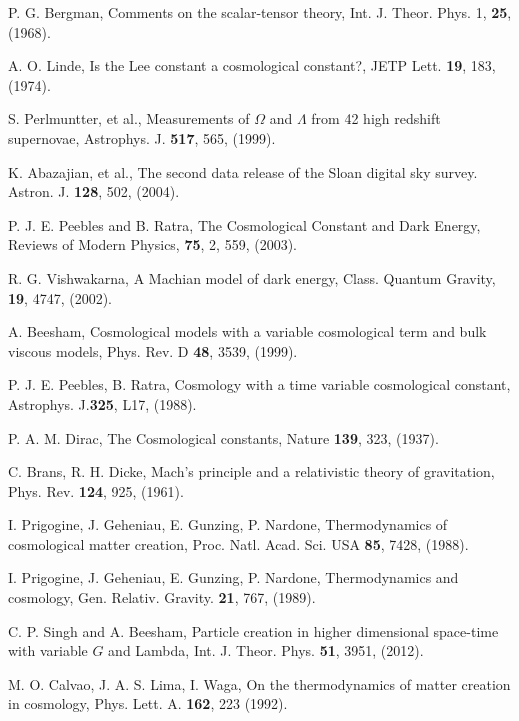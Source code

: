 \documentclass[superscriptaddress,showpacs,pre,twocolumn]{revtex4-1}
\begin{document}
\begin{thebibliography}{99}
	

 P. G. Bergman, Comments on the scalar-tensor theory, Int. J. Theor. Phys. 1, \textbf{25}, (1968).

 A. O. Linde, Is the Lee constant a cosmological constant?, JETP Lett. \textbf{19}, 183, (1974).

 S. Perlmuntter, et al., Measurements of $\Omega$ and $\Lambda$ from 42 high redshift supernovae, Astrophys. J. \textbf{517}, 565, (1999).

 K. Abazajian, et al., The second data release of the Sloan digital sky survey. Astron. J. \textbf{128}, 502, (2004).

 P. J. E. Peebles and B. Ratra, The Cosmological Constant and Dark Energy, Reviews of Modern Physics, \textbf{75}, 2, 559, (2003).


 R. G. Vishwakarna, A Machian model of dark energy, Class. Quantum Gravity, \textbf{19}, 4747, (2002).

 A. Beesham, Cosmological models with a variable cosmological term and bulk viscous models, Phys. Rev. D \textbf{48}, 3539, (1999).

 P. J. E. Peebles, B. Ratra, Cosmology with a time variable cosmological constant, Astrophys. J.\textbf{325}, L17, (1988).

 P. A. M. Dirac, The Cosmological constants, Nature \textbf{139}, 323, (1937).

 C. Brans, R. H. Dicke, Mach's principle and a relativistic theory of gravitation, Phys. Rev. \textbf{124}, 925, (1961).

 I. Prigogine, J. Geheniau, E. Gunzing, P. Nardone, Thermodynamics of cosmological matter creation, Proc. Natl. Acad. Sci. USA \textbf{85}, 7428, (1988).

  I. Prigogine, J. Geheniau, E. Gunzing, P. Nardone, Thermodynamics and cosmology, Gen. Relativ. Gravity. \textbf{21}, 767, (1989).


 C. P. Singh and A. Beesham, Particle creation in higher dimensional space-time with variable $G$ and Lambda, Int. J. Theor. Phys. \textbf{51}, 3951, (2012). 

 M. O. Calvao, J. A. S. Lima, I. Waga, On the thermodynamics of matter creation in cosmology, Phys. Lett. A. \textbf{162}, 223 (1992).


\end{thebibliography}
\end{document}
